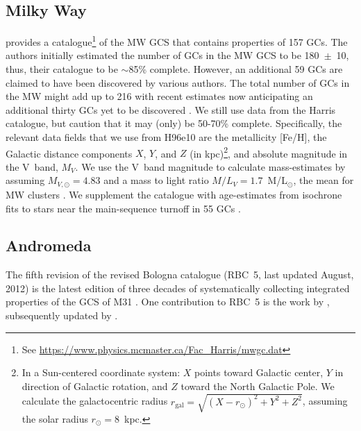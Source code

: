\documentclass[a4paper,fleqn,usenatbib]{mnras}
\begin{document}
\subsection{Milky Way}
\label{sec:milkyway}
\citet[][2010 edition; hereafter H96e10]{1996AJ....112.1487H} provides a
catalogue\footnote{See \url{https://www.physics.mcmaster.ca/Fac_Harris/mwgc.dat}}
of the MW GCS that contains properties of 157 GCs. 
The authors initially estimated the number of GCs in the MW GCS to be 180~$\pm$~10,
thus, their catalogue to be ${\sim}$85\% complete. However, an additional 59 GCs
are claimed to have been discovered by various authors. The total number of GCs
in the MW might add up to 216 with recent estimates now anticipating an additional 
thirty GCs yet to be discovered \citep[e.g.][and references therein]{2018ApJ...863L..38R}.
We still use data from the Harris catalogue, but caution that it may (only) be
50-70\% complete. Specifically, the relevant data fields that we use from H96e10
are the metallicity [Fe/H], the Galactic distance components $X$, $Y$, and $Z$ (in
kpc)\footnote{In a Sun-centered coordinate system: $X$ points toward Galactic
center, $Y$ in direction of Galactic rotation, and $Z$ toward the North Galactic
Pole. We calculate the galactocentric radius $r_{\text{gal}}=\sqrt{(X-r_\odot)^2
+ Y^2 + Z^2}$, assuming the solar radius $r_\odot=8$~kpc.}, and absolute
magnitude in the V~band, $M_V$. We use the V~band magnitude to calculate 
mass-estimates by assuming $M_{V,\odot}=4.83$ and a mass to light ratio 
$M/L_V = 1.7$~M/L$_{\odot}$, the mean for MW clusters \citep{2005ApJS..161..304M}. 
We supplement the catalogue with age-estimates from isochrone fits to stars near 
the main-sequence turnoff in 55 GCs \citep[][hereafter V13]{2013ApJ...775..134V}.


\subsection{Andromeda}
\label{sec:andromeda}
The fifth revision of the revised Bologna catalogue (RBC~5, last updated
August, 2012) is the latest edition of three decades of systematically
collecting integrated properties of the GCS of M31 \citep[][and references therein]{2004A&A...416..917G}. One
contribution to RBC~5 is the work by \citet[][hereafter C11]{2011AJ....141...61C},
subsequently updated by \citet[][hereafter CR16]{2016ApJ...824...42C}.
\end{document}
